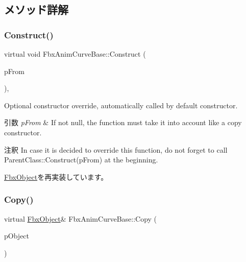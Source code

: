 \subsection{メソッド詳解}
\mbox{\label{class_fbx_anim_curve_base_af8e0d506c1a09c9fbd7432d4eb5caa02}} 
\subsubsection{\texorpdfstring{Construct()}{Construct()}}
{\footnotesize\ttfamily virtual void Fbx\+Anim\+Curve\+Base\+::\+Construct (\begin{DoxyParamCaption}\item[{const \hyperlink{class_fbx_object}{Fbx\+Object} $\ast$}]{p\+From }\end{DoxyParamCaption})\hspace{0.3cm}{\ttfamily [protected]}, {\ttfamily [virtual]}}

Optional constructor override, automatically called by default constructor. 
\begin{DoxyParams}{引数}
{\em p\+From} & If not null, the function must take it into account like a copy constructor. \\
\hline
\end{DoxyParams}
\begin{DoxyRemark}{注釈}
In case it is decided to override this function, do not forget to call Parent\+Class\+::\+Construct(p\+From) at the beginning. 
\end{DoxyRemark}


\hyperlink{class_fbx_object_a313503bc645af3fdceb4a99ef5cea7eb}{Fbx\+Object}を再実装しています。

\mbox{\label{class_fbx_anim_curve_base_abdd0a239c39552fe978b1b571a4d5465}} 
\subsubsection{\texorpdfstring{Copy()}{Copy()}}
{\footnotesize\ttfamily virtual \hyperlink{class_fbx_object}{Fbx\+Object}\& Fbx\+Anim\+Curve\+Base\+::\+Copy (\begin{DoxyParamCaption}\item[{const \hyperlink{class_fbx_object}{Fbx\+Object} \&}]{p\+Object }\end{DoxyParamCaption})\hspace{0.3cm}{\ttfamily [virtual]}}

